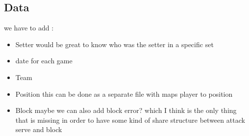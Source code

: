 \documentclass[11pt]{article}
\begin{document}
\subsection{Data}
\label{sec:org4cb68f5}
we have to add :
\begin{itemize}
\item Setter
  would be great to know who was the setter in a specific set
\item date for each game
\item Team
\item Position
  this can be done as a separate file with maps player to
  position
\item Block
  maybe we can also add block error? which  I think is the only
  thing that is missing in order to have some kind of share
  structure between attack serve and block
\end{itemize}
\end{document}
